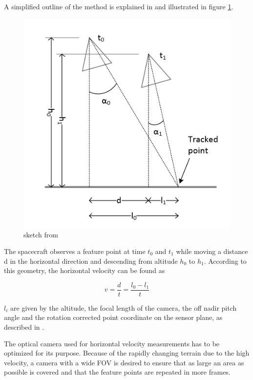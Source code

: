 A simplified outline of the method is explained in \cite{allessandro} and illustrated in figure \ref{horvel}.

\begin{figure}
\begin{center}
\includegraphics[scale=0.5]{figures/horvel.png}
\caption{sketch from \cite{allessandro}}
\label{horvel}
\end{center}
\end{figure}

The spacecraft observes a feature point at time $t_0$ and $t_1$ while moving a distance d in the horizontal direction and descending from altitude $h_0$ to $h_1$. According to this geometry, the horizontal velocity can be found as

\begin{equation}
v=\dfrac{d}{t}=\dfrac{l_0-l_1}{t}
\end{equation}

$l_i$ are given by the altitude, the focal length of the camera, the off nadir pitch angle and the rotation corrected point coordinate on the sensor plane, as described in \cite{allessandro}.


The optical camera used for horizontal velocity measurements has to be optimized for its purpose. Because of the rapidly changing terrain due to the high velocity, a camera with a wide FOV is desired to ensure that as large an area as possible is covered and that the feature points are repeated in more frames.


